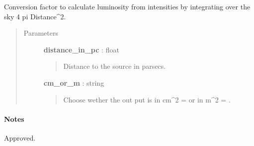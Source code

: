 \documentclass[a4paper,10pt,english]{sphinxmanual}
\begin{document}
\begin{fulllineitems}
\label{functions:astrolyze.functions.units.Int2Lum}
Conversion factor to calculate luminosity from intensities
by integrating over the sky 4 pi Distance\textasciicircum{}2.
\begin{quote}\begin{description}
\item[{Parameters }] \leavevmode
\textbf{distance\_in\_pc} : float
\begin{quote}

Distance to the source in parsecs.
\end{quote}

\textbf{cm\_or\_m} : string
\begin{quote}

Choose wether the out put is in cm\textasciicircum{}2 =  or in
m\textasciicircum{}2 = .
\end{quote}

\end{description}\end{quote}
\paragraph{Notes}

Approved.

\end{fulllineitems}

\end{document}
